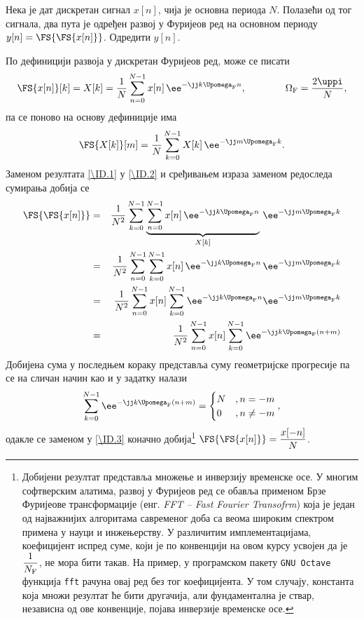 \PID
Нека је дат дискретан сигнал $x[n]$, чија је основна периода $N$. Полазећи од тог сигнала, два пута је одређен развој у Фуријеов ред на 
основном периоду $y[n] = \FS{\FS{x[n]}}$. Одредити $y[n]$. 

\RESENJE
По дефиницији развоја у дискретан Фуријеов ред, може се писати 
\begin{equation}
    \FS{x[n]}[k] = X[k] = \dfrac{1}{N} \sum_{n = 0}^{N-1} x[n] \, \ee^{-\jj k \Upomega_{\rm F} n}, \qquad\qquad \Omega_{\rm F} = \dfrac{2\uppi}{N},
    \label{\ID.1}
\end{equation}
па се поново на основу дефиниције има 
\begin{eqnarray}
    \FS{X[k]}[m] = \dfrac{1}{N} \sum_{k = 0}^{N-1} X[k] \, \ee^{-\jj m \Upomega_{\rm F} k}. \label{\ID.2}
\end{eqnarray}
Заменом резултата \eqref{\ID.1} у \eqref{\ID.2} и сређивањем израза заменом редоследа сумирања добија се 
\begin{eqnarray}
    \FS{\FS{x[n]}} 
    &=&
    \dfrac{1}{N^2} 
    \sum_{k = 0}^{N-1} 
    \underbrace{ \sum_{n = 0}^{N-1} x[n] \, \ee^{-\jj k \Upomega_{\rm F} n} }_{X[k]}
    \, \ee^{-\jj m \Upomega_{\rm F} k}
    \\ 
    &=& 
    \dfrac{1}{N^2} 
    \sum_{n = 0}^{N-1}
    \sum_{k = 0}^{N-1} 
    x[n] \, \ee^{-\jj k \Upomega_{\rm F} n} 
    \, \ee^{-\jj m \Upomega_{\rm F} k} \\
    &=& 
    \dfrac{1}{N^2} 
    \sum_{n = 0}^{N-1}
    x[n]
    \sum_{k = 0}^{N-1} 
    \ee^{-\jj k \Upomega_{\rm F} n} 
    \ee^{-\jj m \Upomega_{\rm F} k}
    \\
    &=& 
    \dfrac{1}{N^2} 
    \sum_{n = 0}^{N-1}
    x[n]
    \sum_{k = 0}^{N-1} 
    \ee^{-\jj k \Upomega_{\rm F} (n + m)} \label{\ID.3}
\end{eqnarray}
Добијена сума у последњем кораку представља суму геометријске прогресије па се на сличан начин као и у задатку
 налази
\begin{equation}
    \sum_{k = 0}^{N-1} 
    \ee^{-\jj k \Upomega_{\rm F} (n + m)}  
    = 
    \begin{cases}
        N &, n = -m \\
        0 &, n \neq -m
    \end{cases},
\end{equation}
одакле се заменом у \eqref{\ID.3} коначно добија\footnote{Добијени резултат 
представља множење и инверзију временске осе. У многим софтверским алатима, развој у Фуријеов ред се обавља 
применом Брзе Фуријеове трансформације (енг. \textit{FFT -- Fast Fourier Transofrm}) која је један од најважнијих алгоритама савременог
доба са веома широким спектром примена у науци и инжењерству. 
У различитим имплементацијама, коефицијент испред суме, који је по конвенцији 
на овом курсу усвојен да је $\dfrac{1}{N_{\rm F}}$,  не мора бити такав. 
На пример, у програмском пакету \texttt{GNU Octave} функција \texttt{fft} рачуна 
овај ред без тог коефицијента. У том случају, константа која множи резултат ће бити другачија, 
али фундаментална је ствар, независна од ове конвенције, појава инверзије временске осе.} $\FS{\FS{x[n]}} = \dfrac{x[-n]}{N}$. 

